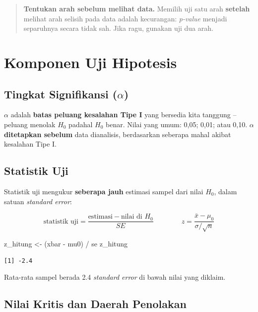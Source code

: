 \documentclass[
  indonesian,
  letterpaper,
]{book}
\newenvironment{Shaded}{\begin{snugshade}}{\end{snugshade}}
\newcommand{\NormalTok}[1]{\textcolor[rgb]{0.00,0.23,0.31}{#1}}
\newcommand{\OtherTok}[1]{\textcolor[rgb]{0.00,0.23,0.31}{#1}}
\newcommand{\SpecialCharTok}[1]{\textcolor[rgb]{0.37,0.37,0.37}{#1}}
\begin{document}
\begin{quote}
\textbf{Tentukan arah sebelum melihat data.} Memilih uji satu arah
\textbf{setelah} melihat arah selisih pada data adalah kecurangan:
\emph{p-value} menjadi separuhnya secara tidak sah. Jika ragu, gunakan
uji dua arah.
\end{quote}

\section{Komponen Uji Hipotesis}\label{komponen-uji-hipotesis}

\subsection{\texorpdfstring{Tingkat Signifikansi
(\(\alpha\))}{Tingkat Signifikansi (\textbackslash alpha)}}\label{tingkat-signifikansi-alpha}

\(\alpha\) adalah \textbf{batas peluang kesalahan Tipe I} yang bersedia
kita tanggung -- peluang menolak \(H_0\) padahal \(H_0\) benar. Nilai
yang umum: 0,05; 0,01; atau 0,10. \(\alpha\) \textbf{ditetapkan sebelum}
data dianalisis, berdasarkan seberapa mahal akibat kesalahan Tipe I.

\subsection{Statistik Uji}\label{statistik-uji}

Statistik uji mengukur \textbf{seberapa jauh} estimasi sampel dari nilai
\(H_0\), dalam satuan \emph{standard error}:

\[\text{statistik uji} = \frac{\text{estimasi} - \text{nilai di } H_0}{SE} \qquad\qquad z = \frac{\bar{x} - \mu_0}{\sigma/\sqrt{n}}\]

\begin{Shaded}
\begin{Highlighting}[]
\NormalTok{z\_hitung }\OtherTok{\textless{}{-}}\NormalTok{ (xbar }\SpecialCharTok{{-}}\NormalTok{ mu0) }\SpecialCharTok{/}\NormalTok{ se}
\NormalTok{z\_hitung}
\end{Highlighting}
\end{Shaded}

\begin{verbatim}
[1] -2.4
\end{verbatim}

Rata-rata sampel berada 2.4 \emph{standard error} di bawah nilai yang
diklaim.

\subsection{Nilai Kritis dan Daerah
Penolakan}\label{nilai-kritis-dan-daerah-penolakan}
\end{document}
